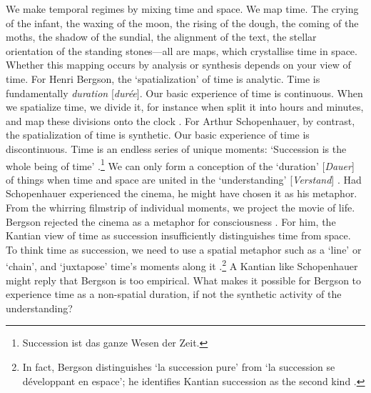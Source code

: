 \documentclass[
  Crown,
  times,
  sageh]{sagej}
\begin{document}
We make temporal regimes by mixing time and space. We map time. The
crying of the infant, the waxing of the moon, the rising of the dough,
the coming of the moths, the shadow of the sundial, the alignment of the
text, the stellar orientation of the standing stones---all are maps,
which crystallise time in space. Whether this mapping occurs by analysis
or synthesis depends on your view of time. For Henri Bergson, the
`spatialization' of time is analytic. Time is fundamentally
\emph{duration} {[}\emph{durée}{]}. Our basic experience of time is
continuous. When we spatialize time, we divide it, for instance when
split it into hours and minutes, and map these divisions onto the clock
\citeyearpar[pp.~71-72]{bergson_oeuvres_1984}. For Arthur Schopenhauer,
by contrast, the spatialization of time is synthetic. Our basic
experience of time is discontinuous. Time is an endless series of unique
moments: `Succession is the whole being of time' \citep[vol.1,
p.~37]{schopenhauer_werke_1999}.\footnote{Succession ist das ganze Wesen
  der Zeit.} We can only form a conception of the `duration'
{[}\emph{Dauer}{]} of things when time and space are united in the
`understanding' {[}\emph{Verstand}{]} \citeyearpar[vol.~1,
p.~40]{schopenhauer_werke_1999}. Had Schopenhauer experienced the
cinema, he might have chosen it as his metaphor. From the whirring
filmstrip of individual moments, we project the movie of life. Bergson
rejected the cinema as a metaphor for consciousness
\citeyearpar[pp.~752ff]{bergson_oeuvres_1984}. For him, the Kantian view
of time as succession insufficiently distinguishes time from space. To
think time as succession, we need to use a spatial metaphor such as a
`line' or `chain', and `juxtapose' time's moments along it
\citeyearpar[pp.~68]{bergson_oeuvres_1984}.\footnote{In fact, Bergson
  distinguishes `la succession pure' from `la succession se développant
  en espace'; he identifies Kantian succession as the second kind
  \citeyearpar[p.~151]{bergson_oeuvres_1984}.} A Kantian like
Schopenhauer might reply that Bergson is too empirical. What makes it
possible for Bergson to experience time as a non-spatial duration, if
not the synthetic activity of the understanding?
\end{document}
